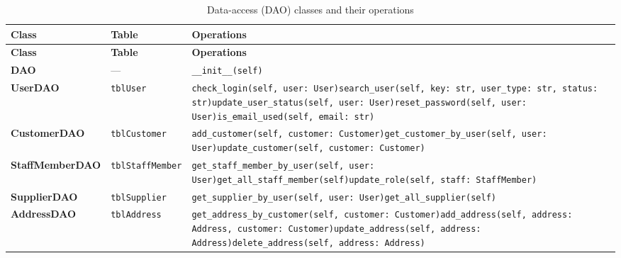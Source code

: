 {\footnotesize
\begin{xltabular}{\textwidth}{@{}L{3.5cm} L{3.4cm} Y@{}}
\caption{Data-access (\textsf{DAO}) classes and their operations}\label{tab:operations}\\
\toprule
\textbf{Class} & \textbf{Table} & \textbf{Operations} \\ \midrule
\endfirsthead
\toprule
\textbf{Class} & \textbf{Table} & \textbf{Operations} \\ \midrule
\endhead
\bottomrule
\endlastfoot
\textbf{DAO} & --- & \texttt{\_\allowbreak{}\_\allowbreak{}init\_\allowbreak{}\_\allowbreak{}(self)} \\
\textbf{UserDAO} & \texttt{tblUser} & \texttt{check\_\allowbreak{}login(self,\allowbreak{} user: User)}\newline \texttt{search\_\allowbreak{}user(self,\allowbreak{} key: str,\allowbreak{} user\_\allowbreak{}type: str,\allowbreak{} status: str)}\newline \texttt{update\_\allowbreak{}user\_\allowbreak{}status(self,\allowbreak{} user: User)}\newline \texttt{reset\_\allowbreak{}password(self,\allowbreak{} user: User)}\newline \texttt{is\_\allowbreak{}email\_\allowbreak{}used(self,\allowbreak{} email: str)} \\
\textbf{CustomerDAO} & \texttt{tblCustomer} & \texttt{add\_\allowbreak{}customer(self,\allowbreak{} customer: Customer)}\newline \texttt{get\_\allowbreak{}customer\_\allowbreak{}by\_\allowbreak{}user(self,\allowbreak{} user: User)}\newline \texttt{update\_\allowbreak{}customer(self,\allowbreak{} customer: Customer)} \\
\textbf{StaffMemberDAO} & \texttt{tblStaffMember} & \texttt{get\_\allowbreak{}staff\_\allowbreak{}member\_\allowbreak{}by\_\allowbreak{}user(self,\allowbreak{} user: User)}\newline \texttt{get\_\allowbreak{}all\_\allowbreak{}staff\_\allowbreak{}member(self)}\newline \texttt{update\_\allowbreak{}role(self,\allowbreak{} staff: StaffMember)} \\
\textbf{SupplierDAO} & \texttt{tblSupplier} & \texttt{get\_\allowbreak{}supplier\_\allowbreak{}by\_\allowbreak{}user(self,\allowbreak{} user: User)}\newline \texttt{get\_\allowbreak{}all\_\allowbreak{}supplier(self)} \\
\textbf{AddressDAO} & \texttt{tblAddress} & \texttt{get\_\allowbreak{}address\_\allowbreak{}by\_\allowbreak{}customer(self,\allowbreak{} customer: Customer)}\newline \texttt{add\_\allowbreak{}address(self,\allowbreak{} address: Address,\allowbreak{} customer: Customer)}\newline \texttt{update\_\allowbreak{}address(self,\allowbreak{} address: Address)}\newline \texttt{delete\_\allowbreak{}address(self,\allowbreak{} address: Address)} \\

\end{xltabular}}
